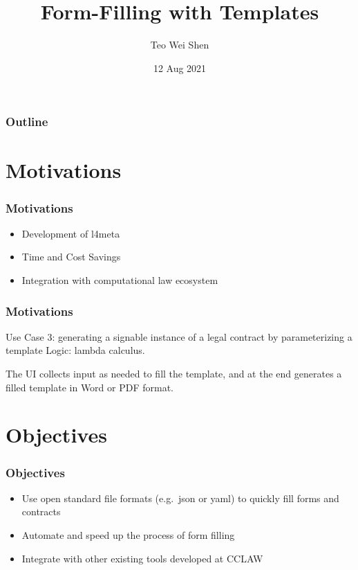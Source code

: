 \documentclass{beamer}
\title{Form-Filling with Templates}
\author{Teo Wei Shen}
\date{12 Aug 2021}
\begin{document}
\frame{\titlepage}

\begin{frame}
    \frametitle{Outline}
    \tableofcontents
\end{frame}

\section{Motivations}
\begin{frame}
\frametitle{Motivations}
    \begin{itemize}
    \item Development of l4meta
    \item Time and Cost Savings
    \item Integration with computational law ecosystem
    \end{itemize}
\end{frame}

\begin{frame}
\frametitle{Motivations}
    \begin{block}{Use Case 3: generating a signable instance of a legal contract by parameterizing a template}
    Logic: lambda calculus.

    The UI collects input as needed to fill the template, and at the end generates a filled template in Word or PDF format.
    \end{block}
\end{frame}

\section{Objectives}
\begin{frame}
\frametitle{Objectives}
    \begin{itemize}
    \item Use open standard file formats (e.g.\ json or yaml) to quickly fill forms and contracts
    \item Automate and speed up the process of form filling
    \item Integrate with other existing tools developed at CCLAW
    \end{itemize}
\end{frame}
\end{document}
